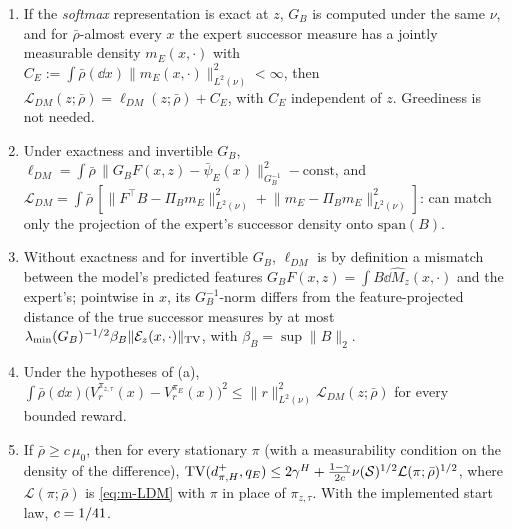 \begin{theorem}\label{thm:m-dm}
\begin{enumerate}[nosep,label=(\alph*)]
\item If the \emph{softmax} representation is exact at $z$, $G_B$ is computed under the same $\nu$, and for $\bar\rho$-almost every $x$ the expert successor measure has a jointly measurable density $m_E(x,\cdot)$ with $C_E:=\int\bar\rho(\dd x)\lVert m_E(x,\cdot)\rVert^2_{L^2(\nu)}<\infty$, then $\mathcal L_{DM}(z;\bar\rho)=\ell_{DM}(z;\bar\rho)+C_E$, with $C_E$ independent of $z$. Greediness is not needed.
\item Under exactness and invertible $G_B$, $\ell_{DM}=\int\bar\rho\,\lVert G_BF(x,z)-\bar\psi_E(x)\rVert^2_{G_B^{-1}}-\mathrm{const}$, and $\mathcal L_{DM}=\int\bar\rho\,[\lVert F^\top B-\Pi_Bm_E\rVert^2_{L^2(\nu)}+\lVert m_E-\Pi_Bm_E\rVert^2_{L^2(\nu)}]$: \DMFB{} can match only the projection of the expert's successor density onto $\mathrm{span}(B)$.
\item Without exactness and for invertible $G_B$, $\ell_{DM}$ is by definition a mismatch between the model's predicted features $G_BF(x,z)=\int B\dd\hat M_z(x,\cdot)$ and the expert's; pointwise in $x$, its $G_B^{-1}$-norm differs from the feature-projected distance of the true successor measures by at most $\lambda_{\min}(G_B)^{-1/2}\beta_B\lVert\mathcal E_z(x,\cdot)\rVert_{\TV}$, with $\beta_B=\sup\lVert B\rVert_2$.
\item Under the hypotheses of (a), $\int\bar\rho(\dd x)\big(V^{\pi_{z,\tau}}_r(x)-V^{\pi_E}_r(x)\big)^2\le\lVert r\rVert^2_{L^2(\nu)}\mathcal L_{DM}(z;\bar\rho)$ for every bounded reward.
\item If $\bar\rho\ge c\,\mu_0$, then for every stationary $\pi$ (with a measurability condition on the density of the difference), $\TV(d^+_{\pi,H},q_E)\le2\gamma^H+\frac{1-\gamma}{2c}\nu(\cS)^{1/2}\mathcal L(\pi;\bar\rho)^{1/2}$, where $\mathcal L(\pi;\bar\rho)$ is \eqref{eq:m-LDM} with $\pi$ in place of $\pi_{z,\tau}$. With the implemented start law, $c=1/\vn{const.n_starts}{41}$.
\end{enumerate}
\end{theorem}

